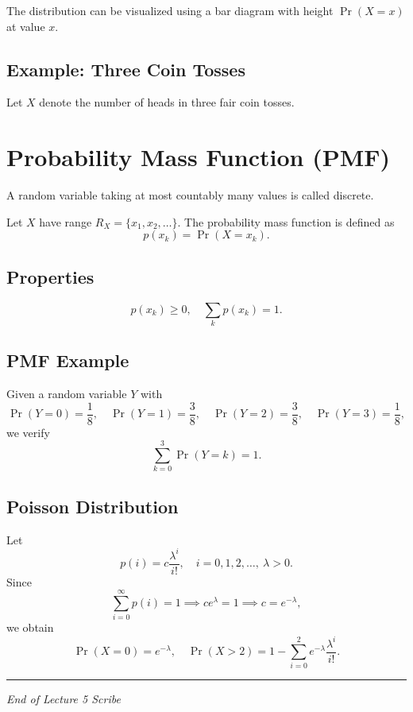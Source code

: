 \documentclass[11pt]{article}
\begin{document}
The distribution can be visualized using a bar diagram with height $\Pr(X = x)$ at value $x$.

\subsection{Example: Three Coin Tosses}
Let $X$ denote the number of heads in three fair coin tosses.

\section{Probability Mass Function (PMF)}
A random variable taking at most countably many values is called discrete.

Let $X$ have range $R_X = \{x_1, x_2, \dots\}$.  
The probability mass function is defined as
\[
p(x_k) = \Pr(X = x_k).
\]

\subsection*{Properties}
\[
p(x_k) \ge 0, \quad \sum_k p(x_k) = 1.
\]

\subsection{PMF Example}
Given a random variable $Y$ with
\[
\Pr(Y=0)=\frac{1}{8}, \quad \Pr(Y=1)=\frac{3}{8}, \quad
\Pr(Y=2)=\frac{3}{8}, \quad \Pr(Y=3)=\frac{1}{8},
\]
we verify
\[
\sum_{k=0}^{3} \Pr(Y=k) = 1.
\]

\subsection{Poisson Distribution}
Let
\[
p(i) = c\frac{\lambda^i}{i!}, \quad i=0,1,2,\dots, \ \lambda>0.
\]
Since
\[
\sum_{i=0}^{\infty} p(i) = 1 \implies c e^{\lambda} = 1 \implies c = e^{-\lambda},
\]
we obtain
\[
\Pr(X=0)=e^{-\lambda}, \quad
\Pr(X>2)=1-\sum_{i=0}^{2} e^{-\lambda}\frac{\lambda^i}{i!}.
\]

\vspace{0.5cm}
\hrule
\vspace{0.2cm}
\begin{center}
\small \textit{End of Lecture 5 Scribe}
\end{center}
\end{document}
